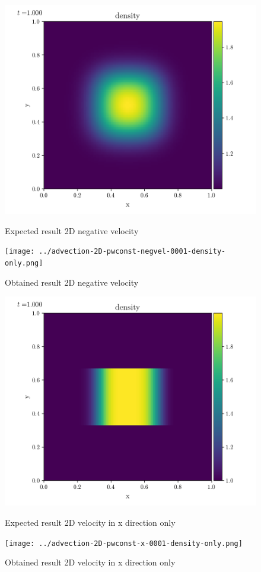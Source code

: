     \begin{figure}[htbp]
        \centering
        \includegraphics[width=.7\textwidth]{./figures/advection-2D-pwconst-negvel-0001-density-only.png}%
        \caption{Expected result 2D negative velocity}
        \texttt{[image: ../advection-2D-pwconst-negvel-0001-density-only.png]}%
        \caption{Obtained result 2D negative velocity}
    \end{figure}

    \begin{figure}[htbp]
        \centering
        \includegraphics[width=.7\textwidth]{./figures/advection-2D-pwconst-x-0001-density-only.png}%
        \caption{Expected result 2D velocity in x direction only}
        \texttt{[image: ../advection-2D-pwconst-x-0001-density-only.png]}%
        \caption{Obtained result 2D velocity in x direction only}
    \end{figure}

